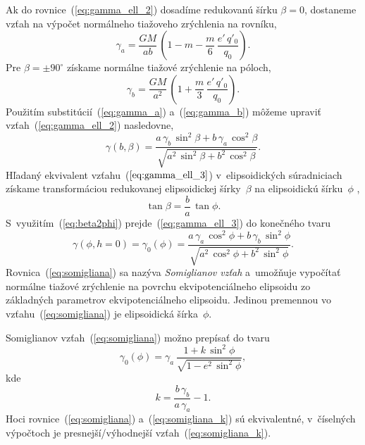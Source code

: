 \documentclass[a4paper,12pt]{book}
\begin{document}
Ak do rovnice~(\ref{eq:gamma_ell_2}) dosadíme redukovanú šírku $\beta = 0$, 
dostaneme vzťah na výpočet normálneho tiažoveho zrýchlenia na rovníku,
%
\begin{equation}
\label{eq:gamma_a}
\gamma_a = \frac{GM}{ab} \, \left( 1 - m - \frac{m}{6} \, \frac{e' \, 
q'_0}{q_0} \right){.}
\end{equation}
%
Pre $\beta = \pm 90^\circ$ získame normálne tiažové zrýchlenie na póloch,
%
\begin{equation}
\label{eq:gamma_b}
\gamma_b = \frac{GM}{a^2} \, \left( 1 + \frac{m}{3} \, \frac{e' \, q'_0}{q_0} 
\right){.}
\end{equation}
%
Použitím substitúcií~(\ref{eq:gamma_a}) a~(\ref{eq:gamma_b}) môžeme upraviť 
vzťah~(\ref{eq:gamma_ell_2}) nasledovne,
%
\begin{equation}
\label{eq:gamma_ell_3}
\gamma(b, \beta) = \frac{a \, \gamma_b \, \sin^2\beta + b \, \gamma_a \, 
\cos^2\beta}{\sqrt{a^2 \, \sin^2\beta + b^2 \, \cos^2\beta}}{.}
\end{equation}
%
Hľadaný ekvivalent vzťahu~($\ref{eq:gamma_ell_3}$) v~elipsoidických 
súradniciach získame transformáciou redukovanej elipsoidickej šírky~$\beta$ na 
elipsoidickú šírku~$\phi$ \parencite[napríklad][]{MoritzPhysicalGeodesy},
%
\begin{equation}
\label{eq:beta2phi}
\tan \beta = \frac{b}{a} \, \tan\phi{.}
\end{equation}
%
S~využitím~(\ref{eq:beta2phi}) prejde~(\ref{eq:gamma_ell_3}) do konečného tvaru
%
\begin{equation}
\label{eq:somigliana}
\gamma(\phi, h = 0) = \gamma_0(\phi) = \frac{a \, \gamma_a \, \cos^2\phi + b \, 
\gamma_b \, \sin^2\phi}{\sqrt{a^2 \, \cos^2\phi + b^2 \, \sin^2\phi}}{.}
\end{equation}
%
Rovnica~(\ref{eq:somigliana}) sa nazýva \emph{Somiglianov vzťah} a~umožňuje 
vypočítať normálne tiažové zrýchlenie na povrchu ekvipotenciálneho elipsoidu zo 
základných parametrov ekvipotenciálneho elipsoidu.  Jedinou premennou vo 
vzťahu~(\ref{eq:somigliana}) je elipsoidická šírka~$\phi$.

Somiglianov vzťah~(\ref{eq:somigliana}) možno prepísať do tvaru 
\parencite{GRS80}
%
\begin{equation}
\label{eq:somigliana_k}
\gamma_0(\phi) = \gamma_a \, \frac{1 + k \, \sin^2\phi}{\sqrt{1 - e^2 \, 
\sin^2\phi}}{,}
\end{equation}
%
kde
%
\begin{equation}
k = \frac{b \, \gamma_b}{a \, \gamma_a} - 1{.}
\end{equation}
%
Hoci rovnice~(\ref{eq:somigliana}) a~(\ref{eq:somigliana_k}) sú ekvivalentné, 
v~číselných výpočtoch je presnejší/výhodnejší vzťah~(\ref{eq:somigliana_k}).
\end{document}
